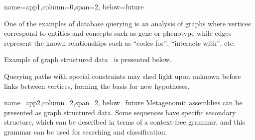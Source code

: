 \documentclass[a0paper,portrait]{baposter}
\begin{document}
\begin{poster}
{


}

{name=app1,column=0,span=2, below=future}
{ %
One of the examples of database querying is an analysis of graphs where vertices correspond to entities and concepts such as gene or phenotype while edges represent the known relationships such as ``codes for'', ``interacts with'', etc.

Example of graph structured data~\cite{Earley} is presented below.

Querying paths with special constraints may shed light upon unknown before links between vertices, forming the basis for new hypotheses.
}


{name=app2,column=2,span=2, below=future}
{
Metagenomic assemblies can be presented as graph structured data.
Some sequences have specific secondary structure, which can be described in terms of a context-free grammar, and this grammar can be used for searching and classification.
}



\end{poster}
\end{document}
